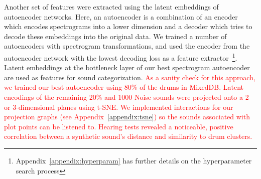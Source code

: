 \documentclass[runningheads,a4paper]{llncs}
\begin{document}
Another set of features were extracted using the latent embeddings of autoencoder networks. Here, an autoencoder is a combination of an encoder which encodes spectrograms into a lower dimension and a decoder which tries to decode these embeddings into the original data. We trained a number of autoencoders with spectrogram transformations, and used the encoder from the autoencoder network with the lowest decoding loss as a feature extractor~\footnote{Appendix~\ref{appendix:hyperparam} has further details on the hyperparameter search process}. Latent embeddings at the bottleneck layer of our best spectrogram autoencoder are used as features for sound categorization. \textcolor{red}{ As a sanity check for this approach, we trained our best autoencoder using 80\% of the drums in MixedDB. Latent encodings of the remaining 20\% and 1000 Noise sounds were projected onto a 2 or 3-dimensional planes using t-SNE. We implemented interactions for our projection graphs (see Appendix~\ref{appendix:tsne}) so the sounds associated with plot points can be listened to. Hearing tests revealed a noticeable, positive correlation between a synthetic sound's distance and similarity to drum clusters.}

\begin{table}[]
\caption{Overview of model architectures. Further details in Appendix~\ref{appendix:classifier_definitions}}
\end{table}
\end{document}
